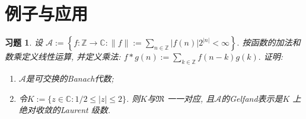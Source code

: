 \documentclass[UTF8,twoside]{ctexbook}
\newtheorem{exercise}{习题}[section]
\newcommand{\h}{\mathscr}
\newcommand{\kx}{\mathbb}
\numberwithin{equation}{section}
\begin{document}
	\section{例子与应用}
	\begin{exercise}
		设
		$
		\h A:=\left\{
		f:\kx Z\rightarrow\kx C : \|f\|:=\sum_{n\in\kx Z}|f(n)|2^{|n|}<\infty
		\right\}.
		$
		按函数的加法和数乘定义线性运算, 并定义乘法:
		$
		f*g(n):=\sum\limits_{k\in\kx Z}f(n-k)g(k).
		$
		证明:
		\begin{enumerate}[(1)]
			\item$\h A$是可交换的Banach代数;
			\item 令$K:=\{z\in\kx C:1/2\leq|z|\leq2\}$. 则$K$与$\mathfrak M$ 一一对应, 且$\h A$的Gelfand表示是$K$ 上绝对收敛的Laurent 级数.
		\end{enumerate}
	\end{exercise}
\end{document}
